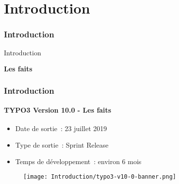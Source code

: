 %

\section{Introduction}
\begin{frame}[fragile]
	\frametitle{Introduction}

	\begin{center}\huge{Introduction}\end{center}
	\begin{center}\huge{\color{typo3darkgrey}\textbf{Les faits}}\end{center}

\end{frame}


\begin{frame}[fragile]
	\frametitle{Introduction}
	\framesubtitle{TYPO3 Version 10.0 - Les faits}

	\begin{itemize}
		\item Date de sortie~: 23 juillet 2019
		\item Type de sortie~: Sprint Release
		\item Temps de développement~: environ 6 mois
	\end{itemize}

	\begin{figure}
		\texttt{[image: Introduction/typo3-v10-0-banner.png]}
	\end{figure}

\end{frame}


